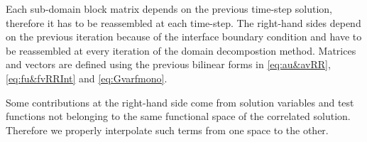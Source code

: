 Each sub-domain block matrix depends on the previous time-step solution, therefore it has to be reassembled at each time-step. The right-hand sides depend on the previous iteration because of the interface boundary condition and have to be reassembled at every iteration of the domain decompostion method. Matrices and vectors are defined using the previous bilinear forms in \eqref{eq:au&avRR}, \eqref{eq:fu&fvRRInt} and \eqref{eq:Gvarfmono}.
%

Some contributions at the right-hand side come from solution variables and test functions not belonging to the same functional space of the correlated solution. Therefore we properly interpolate such terms from one space to the other.


